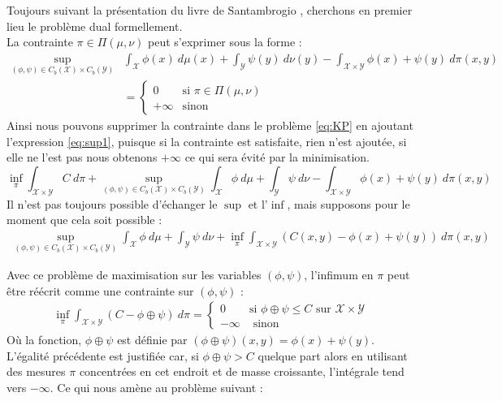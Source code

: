 \documentclass[a4paper,12pt]{article}
\begin{document}
Toujours suivant la présentation du livre de Santambrogio \cite{santambrogio2015optimal}, cherchons en premier lieu le problème dual formellement. \\
La contrainte $\pi\in\Pi(\mu,\nu)$ peut s'exprimer sous la forme : 
\begin{align}
\sup_{(\phi,\psi)\in C_b(\mathcal{X})\times C_b(\mathcal{Y})}& \int_{\mathcal{X}} \phi(x)\ d\mu (x) + \int_{\mathcal{Y}}\psi(y)\  d\nu(y) - \int_{\mathcal{X}\times\mathcal{Y}}\phi(x)+\psi(y)\ d\pi(x,y)\label{eq:sup1}\\
&= \left\{\begin{array}{cl}
0 & \text{si } \pi \in\Pi(\mu,\nu)\\
+\infty & \text{sinon}
\end{array}\right.\nonumber
\end{align}
Ainsi nous pouvons supprimer la contrainte dans le problème \eqref{eq:KP} en ajoutant l'expression \eqref{eq:sup1}, puisque si la contrainte est satisfaite, rien n'est ajoutée, si elle ne l'est pas nous obtenons $+\infty$ ce qui sera évité par la minimisation. 
$$
\inf_{\pi} \int_{\mathcal{X}\times\mathcal{Y}} C\ d\pi + \sup_{(\phi,\psi)\in C_b(\mathcal{X})\times C_b(\mathcal{Y})} \int_{\mathcal{X}} \phi\ d\mu + \int_{\mathcal{Y}}\psi\  d\nu - \int_{\mathcal{X}\times\mathcal{Y}}\phi(x)+\psi(y)\ d\pi(x,y)
$$
Il n'est pas toujours possible d'échanger le $\sup$ et l'$\inf$, mais supposons pour le moment que cela soit possible : 
\begin{align}
\sup_{(\phi,\psi)\in C_b(\mathcal{X})\times C_b(\mathcal{Y})} \int_{\mathcal{X}} \phi\ d\mu + \int_{\mathcal{Y}}\psi\  d\nu + \inf_{\pi} \int_{\mathcal{X}\times\mathcal{Y}}(C(x,y) - \phi(x)+\psi(y))\ d\pi(x,y)
\label{eq:infsupexchange}
\end{align}

Avec ce problème de maximisation sur les variables $(\phi,\psi)$, l'infimum en $\pi$ peut être réécrit comme une contrainte sur $(\phi,\psi)$ : 
\begin{align}
\inf_{\pi} \int_{\mathcal{X}\times\mathcal{Y}}(C - \phi\oplus\psi) \ d\pi = 
\left\{
\begin{array}{cl}
0 & \text{si } \phi\oplus\psi\leq C \text{ sur } \mathcal{X}\times\mathcal{Y}\\
-\infty &\text{ sinon}
\end{array}
\right.
\end{align}
Où la fonction, $\phi\oplus\psi$ est définie par $(\phi\oplus\psi)(x,y) = \phi(x)+\psi(y)$. L'égalité précédente est justifiée car, si $\phi\oplus\psi>C$ quelque part alors en utilisant des mesures $\pi$ concentrées en cet endroit et de masse croissante, l'intégrale tend vers $-\infty$. Ce qui nous amène au problème suivant : \\
\end{document}
